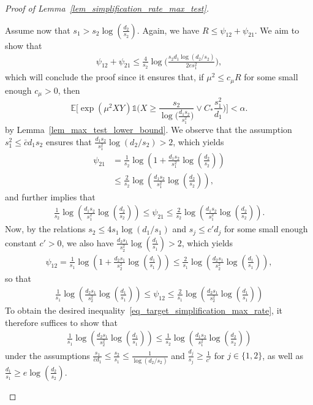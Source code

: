 \documentclass[10pt,a4paper]{amsart}
\newcommand{\Ct}{C_{*}}
\newcommand{\EE}{\mathbb{E}}
\newcommand{\one}{\mathds{1}}
\begin{document}
\begin{proof}[Proof of Lemma~\ref{lem_simplification_rate_max_test}]
\begin{enumerate}
    Assume now that $s_1 > s_2\log\left(\frac{d_2}{s_2}\right)$. 
    Again, we have $R \leq \psi_{12} + \psi_{21}$. 
    We aim to show that
    \begin{align}
        \psi_{12} + \psi_{21} \leq \frac{4}{s_2}\log\big(\frac{s_2d_1\log(d_2/s_2)}{2es_1^2}\big),\label{eq_target_simplification_max_rate}
    \end{align}
    which will conclude the proof since it ensures that, if $\mu^2 \leq c_\mu R$ for some small enough $c_\mu>0$, then 
    $$\EE\Big[\exp(\mu^2XY)\one\Big(X \geq \frac{s_2}{\log\big(\frac{d_1s_2}{s_1^2}\big)}\lor  \Ct \frac{s_1^2}{d_1}\Big)\Big] < \alpha.$$ 
    by Lemma~\ref{lem_max_test_lower_bound}.
    We observe that the assumption $s_1^2 \leq \bar c d_1 s_2$ ensures that $\frac{d_1s_2}{s_1^2}\log(d_2/s_2) > 2$, which yields
    \begin{align*}
        \psi_{21} &= \frac{1}{s_2} \log\left(1+ \frac{d_1s_2}{s_1^2} \log\left(\frac{d_2}{s_2}\right)\right) \\
        & \leq \frac{2}{s_2} \log\left(\frac{d_1s_2}{s_1^2} \log\left(\frac{d_2}{s_2}\right)\right),
    \end{align*}   
    and further implies that 
    \begin{align}
        \frac{1}{s_2} \log\left(\frac{d_1s_2}{s_1^2} \log\left(\frac{d_2}{s_2}\right)\right) \leq \psi_{21}  \leq \frac{2}{s_2} \log\left(\frac{d_1s_2}{s_1^2} \log\left(\frac{d_2}{s_2}\right)\right).\label{eq_equiv_psi21}
    \end{align}
    Now, by the relations $s_2 \leq 4 s_1\log(d_1/s_1)$ and $s_j \leq c' d_j$ for some small enough constant $c'>0$, we also have $\frac{d_2s_1}{s_2^2} \log\left(\frac{d_1}{s_1}\right)>2$, which yields
    \begin{align*}
        \psi_{12} = \frac{1}{s_1} \log\left(1+ \frac{d_2s_1}{s_2^2} \log\left(\frac{d_1}{s_1}\right)\right) \leq \frac{2}{s_1} \log\left( \frac{d_2s_1}{s_2^2} \log\left(\frac{d_1}{s_1}\right)\right),
    \end{align*}
    so that
    \begin{align}
        \frac{1}{s_1} \log\left( \frac{d_2s_1}{s_2^2} \log\left(\frac{d_1}{s_1}\right)\right) \leq \psi_{12} \leq \frac{2}{s_1} \log\left( \frac{d_2s_1}{s_2^2} \log\left(\frac{d_1}{s_1}\right)\right) \label{eq_equiv_psi12}
    \end{align}
    To obtain the desired inequality~\eqref{eq_target_simplification_max_rate}, it therefore suffices to show that 
    \begin{align}
        \frac{1}{s_1} \log\left( \frac{d_2s_1}{s_2^2} \log\left(\frac{d_1}{s_1}\right)\right) \leq \frac{1}{s_2} \log\left( \frac{d_1s_2}{s_1^2} \log\left(\frac{d_2}{s_2}\right)\right)\label{eq_new_target}
    \end{align}
    under the assumptions $\frac{s_1}{\bar c d_1} \leq \frac{s_2}{s_1} \leq \frac{1}{\log(d_2/s_2)}$ and $\frac{d_j}{s_j} \geq \frac{1}{c'}$ for $j\in\{1,2\}$, as well as $\frac{d_1}{s_1} \geq e \log\left(\frac{d_2}{s_2}\right)$. 
    

\end{enumerate}
\end{proof}
\end{document}
